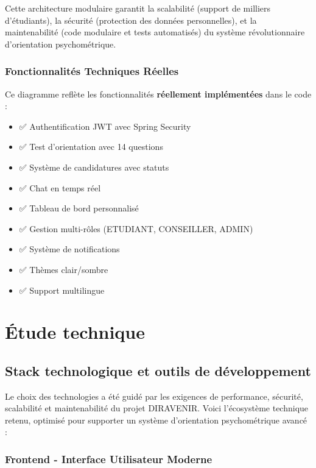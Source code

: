 \documentclass[12pt,a4paper]{report}
\begin{document}
Cette architecture modulaire garantit la scalabilité (support de milliers d'étudiants), la sécurité (protection des données personnelles), et la maintenabilité (code modulaire et tests automatisés) du système révolutionnaire d'orientation psychométrique.

\subsubsection{Fonctionnalités Techniques Réelles}

Ce diagramme reflète les fonctionnalités \textbf{réellement implémentées} dans le code :
\begin{itemize}
    \item ✅ Authentification JWT avec Spring Security
    \item ✅ Test d'orientation avec 14 questions
    \item ✅ Système de candidatures avec statuts
    \item ✅ Chat en temps réel
    \item ✅ Tableau de bord personnalisé
    \item ✅ Gestion multi-rôles (ETUDIANT, CONSEILLER, ADMIN)
    \item ✅ Système de notifications
    \item ✅ Thèmes clair/sombre
    \item ✅ Support multilingue
\end{itemize}


\section{Étude technique}

\subsection{Stack technologique et outils de développement}

Le choix des technologies a été guidé par les exigences de performance, sécurité, scalabilité et maintenabilité du projet DIRAVENIR. Voici l'écosystème technique retenu, optimisé pour supporter un système d'orientation psychométrique avancé :

\subsubsection{Frontend - Interface Utilisateur Moderne}
\end{document}
